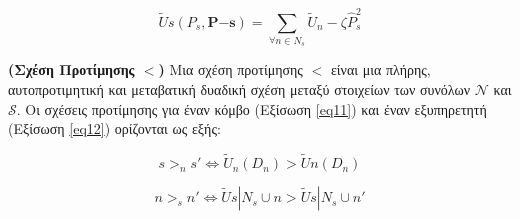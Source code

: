\vspace{-5pt}

\begin{equation}
\widetilde{U}s(P_s, \mathbf{P{-s}}) = \sum\limits_{\forall n\in N_s} \widetilde{U}_n - \zeta \hat{P}_s^2
\label{eq10}
\end{equation}

\vspace{-5pt}

\noindent
\begin{definition} \label{Definition 2} \textbf{(Σχέση Προτίμησης $<$)} Μια σχέση προτίμησης $<$ είναι μια πλήρης, αυτοπροτιμητική και μεταβατική δυαδική σχέση μεταξύ στοιχείων των συνόλων $\mathcal{N}$ και $\mathcal{S}$. Οι σχέσεις προτίμησης για έναν κόμβο (Εξίσωση \ref{eq11}) και έναν εξυπηρετητή (Εξίσωση \ref{eq12}) ορίζονται ως εξής:

\vspace{-5pt}

\begin{equation}
s >_n s' \Longleftrightarrow \widetilde{U}_n(D_n) > \widetilde{U}n(D_n)
\label{eq11}
\end{equation}

\vspace{-5pt}

\begin{equation}
n >_s n' \Longleftrightarrow \widetilde{U}s|{N_s \cup {n}} > \widetilde{U}s|{N_s \cup {n'}}
\label{eq12}
\end{equation}

\vspace{-8pt}

\end{definition}

